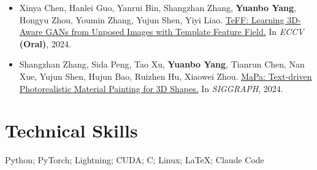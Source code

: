 \documentclass[letterpaper,11pt]{article}
\begin{document}
\begin{itemize}[leftmargin=0.15in]
  \item Xinya Chen, Hanlei Guo, Yanrui Bin, Shangzhan Zhang, \textbf{Yuanbo Yang}, Hongyu Zhou, Youmin Zhang, Yujun Shen, Yiyi Liao.
  \href{https://xdimlab.github.io/TeFF/}{TeFF: Learning 3D-Aware GANs from Unposed Images with Template Feature Field.}
  In \textit{ECCV} \textbf{(Oral)}, 2024.

  \item Shangzhan Zhang, Sida Peng, Tao Xu, \textbf{Yuanbo Yang}, Tianrun Chen, Nan Xue, Yujun Shen, Hujun Bao, Ruizhen Hu, Xiaowei Zhou.
  \href{https://zhanghe3z.github.io/MaPa/}{MaPa: Text-driven Photorealistic Material Painting for 3D Shapes.}
  In \textit{SIGGRAPH}, 2024.

\end{itemize}

\section{Technical Skills}
\begin{itemize}[leftmargin=0.15in, label={}]
  \small{\item{
    Python; PyTorch; Lightning; CUDA; C; Linux; LaTeX; Claude Code
  }}
\end{itemize}
\end{document}
